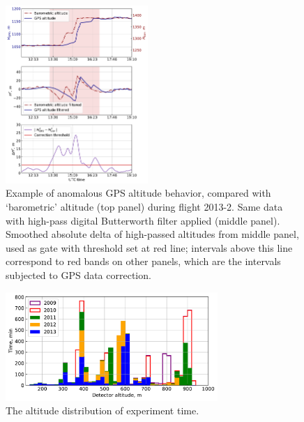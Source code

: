 \documentclass[final,5p,times,twocolumn]{elsarticle}
\begin{document}
\begin{figure}[tb]
    \includegraphics[width=0.48\textwidth]{height_correction.pdf} 
    \caption{Example of anomalous GPS altitude behavior, compared with `barometric' altitude (top panel) during flight 2013-2. Same data with high-pass digital Butterworth filter applied (middle panel). Smoothed absolute delta of high-passed altitudes from middle panel, used as gate with threshold set at red line; intervals above this line correspond to red bands on other panels, which are the intervals subjected to GPS data correction.}
\label{fig:h_corr}
\end{figure}


\begin{figure}[t]
    \includegraphics[width=19pc]{time_on_altitude.pdf}%
    \caption{The altitude distribution of experiment time.}
    \label{fig:time_on_altitude}
\end{figure}
\end{document}
